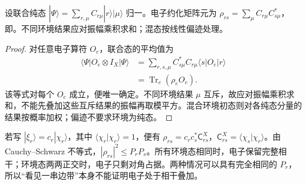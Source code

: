 \begin{lemma}[未读取环境时的偏迹相干核]
设联合纯态 $|\Psi\rangle=\sum_{r,\mu}C_{r\mu}|r\rangle|\mu\rangle$ 归一。电子约化矩阵元为 $\rho_{rs}=\sum_\mu C_{r\mu}C_{s\mu}^*$，即。不同环境结果应对振幅乘积求和；混态按线性偏迹处理。
\end{lemma}
\begin{proof}
对任意电子算符 $O_e$，联合态的平均值为
\begin{align*}
 \langle\Psi|O_e\otimes I_X|\Psi\rangle
 &=\sum_{r,s,\mu}C_{s\mu}^*C_{r\mu}\langle s|O_e|r\rangle\\
 &=\operatorname{Tr}_e(\rho_e O_e).
\end{align*}
该等式对每个 $O_e$ 成立，便唯一确定。不同环境结果 $\mu$ 互斥，故应对振幅乘积求和，不能先叠加这些互斥结果的振幅再取模平方。混合环境初态则对各纯态分量的结果按概率加权；偏迹不要求环境为纯态。
\end{proof}


若写 $|\xi_r\rangle=c_r|\chi_r\rangle$，其中 $\langle\chi_r|\chi_r\rangle=1$，便有 $\rho_{rs}=c_rc_s^*\mathsf C_{rs}^X$，$\mathsf C_{rs}^X=\langle\chi_s|\chi_r\rangle$。由 Cauchy--Schwarz 不等式，$|\rho_{rs}|^2\le P_rP_s$。所有环境态相同时，电子保留完整相干；环境态两两正交时，电子只剩对角占据。两种情况可以具有完全相同的 $P_r$，所以“看见一串边带”本身不能证明电子处于相干叠加。

